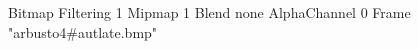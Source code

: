 {Bitmap
	{Filtering 1}
	{Mipmap 1}
	{Blend none}
	{AlphaChannel 0}
	{Frame "arbusto4#autlate.bmp"}
}
